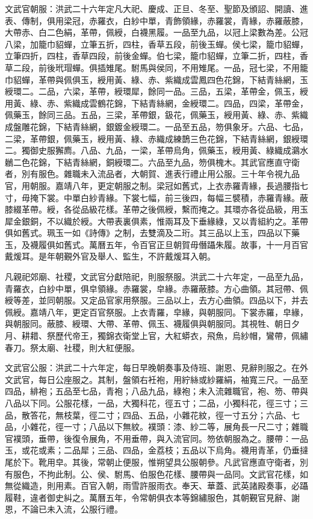 文武官朝服：洪武二十六年定凡大祀、慶成、正旦、冬至、聖節及頒詔、開讀、進表、傳制，俱用梁冠，赤羅衣，白紗中單，青飾領緣，赤羅裳，青緣，赤羅蔽膝，大帶赤、白二色絹，革帶，佩綬，白襪黑履。一品至九品，以冠上梁數為差。公冠八梁，加籠巾貂蟬，立筆五折，四柱，香草五段，前後玉蟬。侯七梁，籠巾貂蟬，立筆四折，四柱，香草四段，前後金蟬。伯七梁，籠巾貂蟬，立筆二折，四柱，香草二段，前後玳瑁蟬。俱插雉尾。駙馬與侯同，不用雉尾。一品，冠七梁，不用籠巾貂蟬，革帶與佩俱玉，綬用黃、綠、赤、紫織成雲鳳四色花錦，下結青絲網，玉綬環二。二品，六梁，革帶，綬環犀，餘同一品。三品，五梁，革帶金，佩玉，綬用黃、綠、赤、紫織成雲鶴花錦，下結青絲網，金綬環二。四品，四梁，革帶金，佩藥玉，餘同三品。五品，三梁，革帶銀，鈒花，佩藥玉，綬用黃、綠、赤、紫織成盤雕花錦，下結青絲網，銀鍍金綬環二。一品至五品，笏俱象牙。六品、七品，二梁，革帶銀，佩藥玉，綬用黃、綠、赤織成練鵲三色花錦，下結青絲網，銀綬環二。獨御史服獬廌。八品、九品，一梁，革帶烏角，佩藥玉，綬用黃、綠織成鸂水鶒二色花錦，下結青絲網，銅綬環二。六品至九品，笏俱槐木。其武官應直守衛者，別有服色。雜職未入流品者，大朝賀、進表行禮止用公服。三十年令視九品官，用朝服。嘉靖八年，更定朝服之制。梁冠如舊式，上衣赤羅青緣，長過腰指七寸，毋掩下裳。中單白紗青緣。下裳七幅，前三後四，每幅三襞積，赤羅青緣。蔽膝綴革帶。綬，各從品級花樣。革帶之後佩綬，繫而掩之。其環亦各從品級，用玉犀金銀銅，不以織於綬。大帶表裏俱素，惟兩耳及下垂緣綠，又以青組約之。革帶俱如舊式。珮玉一如《詩傳》之制，去雙滴及二珩。其三品以上玉，四品以下藥玉，及襪履俱如舊式。萬曆五年，令百官正旦朝賀毋僭躡朱履。故事，十一月百官戴煖耳。是年朝覲外官及舉人、監生，不許戴煖耳入朝。

凡親祀郊廟、社稷，文武官分獻陪祀，則服祭服。洪武二十六年定，一品至九品，青羅衣，白紗中單，俱皁領緣。赤羅裳，皁緣。赤羅蔽膝。方心曲領。其冠帶、佩綬等差，並同朝服。又定品官家用祭服。三品以上，去方心曲領。四品以下，并去佩綬。嘉靖八年，更定百官祭服。上衣青羅，皁緣，與朝服同。下裳赤羅，皁緣，與朝服同。蔽膝、綬環、大帶、革帶、佩玉、襪履俱與朝服同。其視牲、朝日夕月、耕耤、祭歷代帝王，獨錦衣衛堂上官，大紅蟒衣，飛魚，烏紗帽，鸞帶，佩繡春刀。祭太廟、社稷，則大紅便服。

文武官公服：洪武二十六年定，每日早晚朝奏事及侍班、謝恩、見辭則服之。在外文武官，每日公座服之。其制，盤領右衽袍，用紵絲或紗羅絹，袖寬三尺。一品至四品，緋袍；五品至七品，青袍；八品九品，綠袍；未入流雜職官，袍、笏、帶與八品以下同。公服花樣，一品，大獨科花，徑五寸；二品，小獨科花，徑三寸；三品，散答花，無枝葉，徑二寸；四品、五品，小雜花紋，徑一寸五分；六品、七品，小雜花，徑一寸；八品以下無紋。襆頭：漆、紗二等，展角長一尺二寸；雜職官襆頭，垂帶，後復令展角，不用垂帶，與入流官同。笏依朝服為之。腰帶：一品玉，或花或素；二品犀；三品、四品，金荔枝；五品以下烏角。襪用青革，仍垂撻尾於下。靴用皁。其後，常朝止便服，惟朔望具公服朝參。凡武官應直守衛者，別有服色，不拘此制。公、侯、駙馬、伯服色花樣、腰帶與一品同。文武官花樣，如無從織造，則用素。百官入朝，雨雪許服雨衣。奉天、華蓋、武英諸殿奏事，必躡履鞋，違者御史糾之。萬曆五年，令常朝俱衣本等錦繡服色，其朝覲官見辭、謝恩，不論已未入流，公服行禮。

